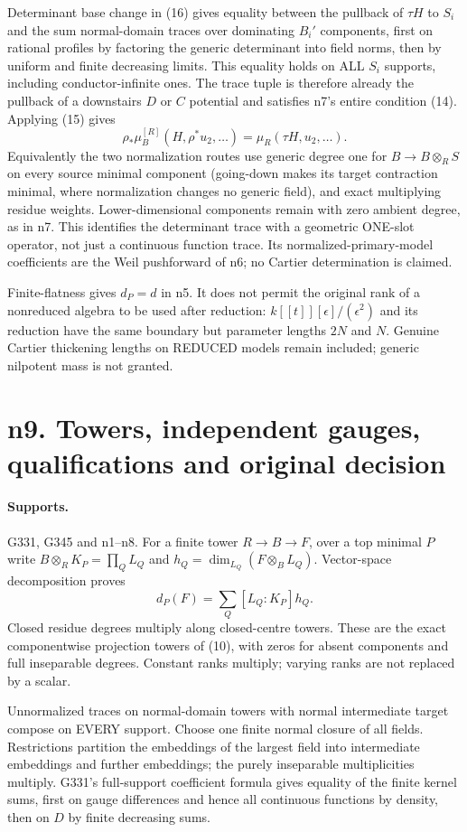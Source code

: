 \documentclass[11pt]{article}
\begin{document}
Determinant base change in (16) gives equality between the pullback of $\tau H$ to $S_i$ and the sum normal-domain traces over dominating $B_i'$ components, first on rational profiles by factoring the generic determinant into field norms, then by uniform and finite decreasing limits. This equality holds on ALL $S_i$ supports, including conductor-infinite ones. The trace tuple is therefore already the pullback of a downstairs $D$ or $C$ potential and satisfies n7's entire condition (14). Applying (15) gives
\[
 \rho_*\mu_B^{[R]}(H,\rho^*u_2,\ldots)=\mu_R(\tau H,u_2,\ldots). \tag{20}
\]
Equivalently the two normalization routes use generic degree one for $B\to B\otimes_RS$ on every source minimal component (going-down makes its target contraction minimal, where normalization changes no generic field), and exact multiplying residue weights. Lower-dimensional components remain with zero ambient degree, as in n7. This identifies the determinant trace with a geometric ONE-slot operator, not just a continuous function trace. Its normalized-primary-model coefficients are the Weil pushforward of n6; no Cartier determination is claimed.

Finite-flatness gives $d_P=d$ in n5. It does not permit the original rank of a nonreduced algebra to be used after reduction: $k[[t]][\epsilon]/(\epsilon^2)$ and its reduction have the same boundary but parameter lengths $2N$ and $N$. Genuine Cartier thickening lengths on REDUCED models remain included; generic nilpotent mass is not granted.


\section{n9. Towers, independent gauges, qualifications and original decision}
\paragraph{Supports.} G331, G345 and n1--n8.
For a finite tower $R\to B\to F$, over a top minimal $P$ write
$B\otimes_RK_P=\prod_Q L_Q$ and $h_Q=\dim_{L_Q}(F\otimes_BL_Q)$. Vector-space decomposition proves
\[
 d_P(F)=\sum_Q[L_Q:K_P]h_Q. \tag{21}
\]
Closed residue degrees multiply along closed-centre towers. These are the exact componentwise projection towers of (10), with zeros for absent components and full inseparable degrees. Constant ranks multiply; varying ranks are not replaced by a scalar.

Unnormalized traces on normal-domain towers with normal intermediate target compose on EVERY support. Choose one finite normal closure of all fields. Restrictions partition the embeddings of the largest field into intermediate embeddings and further embeddings; the purely inseparable multiplicities multiply. G331's full-support coefficient formula gives equality of the finite kernel sums, first on gauge differences and hence all continuous functions by density, then on $D$ by finite decreasing sums.
\end{document}
